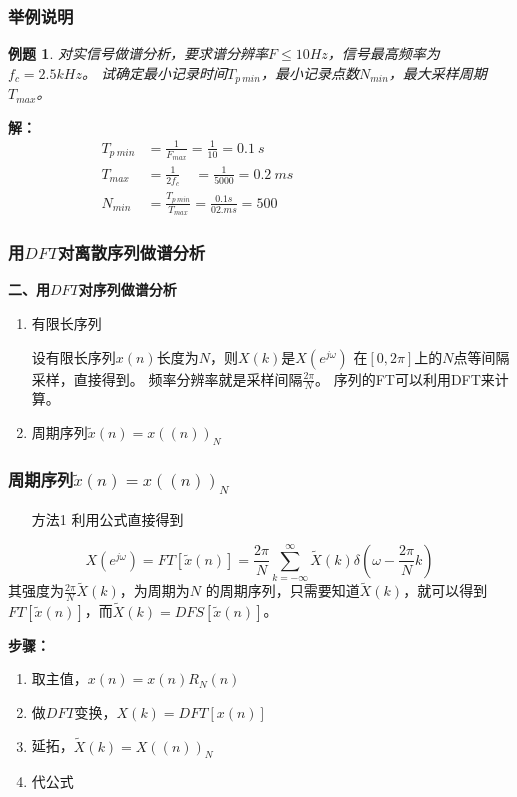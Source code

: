 \documentclass[notheorems,compress,mathserif,table]{beamer}
\newtheorem{example}{例题}
\begin{document}
\begin{frame}[shrink]\frametitle{举例说明}%
\begin{example}
对实信号做谱分析，要求谱分辨率$F\leq10Hz$，信号最高频率为$f_c = 2.5kHz$。
试确定最小记录时间$T_{p\: min}$，最小记录点数$N_{min}$，最大采样周期$T_{max}$。	
\end{example}
%
%
\textbf{解：}
\begin{equation*}
\begin{split}
    T_{p\:min} &= \frac{1}{F_{max}}   =  \frac{1}{10} =0.1\:s \quad\qquad\qquad\qquad\qquad\qquad   \\
    T_{max}    &= \frac{1}{2f_c} \quad     =  \frac{1}{5000} =0.2\:ms               \\
    N_{min}    &= \frac{T_{p\: min}}{T_{max}}  = \frac{0.1s}{02.ms}  = 500
\end{split}
\end{equation*}
\end{frame}


\begin{frame}[shrink]\frametitle{用$DFT$对离散序列做谱分析}%
\textbf{二、用$DFT$对序列做谱分析}
\begin{enumerate}
  \item 有限长序列\par
        \qquad 设有限长序列$x(n)$长度为$N$，则$X(k)$是$X(e^{j\omega})$ 在$[0,2\pi]$上的$N$点等间隔采样，直接得到。
        频率分辨率就是采样间隔$\frac{2\pi}{N} $。
        序列的FT可以利用DFT来计算。
  \item 周期序列$\tilde{x}(n) = x((n))_N$

\end{enumerate}
\end{frame}



\begin{frame}[shrink]\frametitle{周期序列$\tilde{x}(n) = x((n))_N$}%


  \begin{enumerate}
    \item [方法1]利用公式直接得到
  \end{enumerate}
      $$ X(e^{j\omega}) =FT[\tilde{x}(n)] = \frac{2\pi}{N}\sum_{k=-\infty}^{\infty}\tilde{X}(k)\delta(\omega-\frac{2\pi}{N}k)$$
      其强度为$\frac{2\pi}{N}\tilde{X}(k)$，为周期为$N$ 的周期序列，只需要知道$\tilde{X}(k)$，就可以得到$FT[\tilde{x}(n)]$，而$\tilde{X}(k) = DFS[\tilde{x}(n)]$。\par
      \textbf{步骤：}
      \begin{enumerate}
        \item 取主值，$x(n) = x(n)R_N(n)$
        \item 做$DFT$变换，$X(k) = DFT[x(n)]$
        \item 延拓，$\tilde{X}(k) = X((n))_N$
        \item 代公式
      \end{enumerate}
    
\end{frame}
\end{document}
